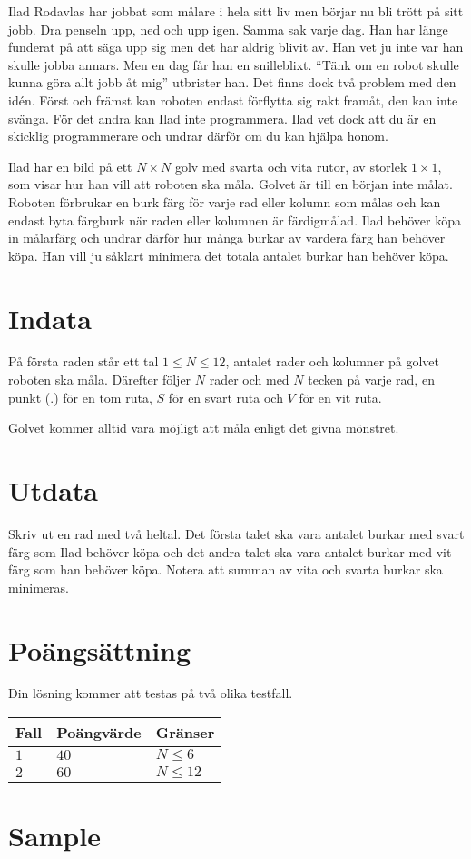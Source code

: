 Ilad Rodavlas har jobbat som målare i hela sitt liv men börjar nu bli trött på sitt jobb. Dra penseln upp, ned och upp igen. Samma sak varje dag. Han har länge funderat på att säga upp sig men det har aldrig blivit av. Han vet ju inte var han skulle jobba annars. Men en dag får han en snilleblixt. “Tänk om en robot skulle kunna göra allt jobb åt mig” utbrister han. Det finns dock två problem med den  idén. Först och främst kan roboten endast förflytta sig rakt framåt, den kan inte svänga. För det andra kan Ilad inte programmera. Ilad vet dock att du är en skicklig programmerare och undrar därför om du kan hjälpa honom. 

Ilad har en bild på ett $N \times N$ golv med svarta och vita rutor, av storlek $1 \times 1$, som visar hur han vill att roboten ska måla. Golvet är till en början inte målat. Roboten förbrukar en burk färg för varje rad eller kolumn som målas och kan endast byta färgburk när raden eller kolumnen är färdigmålad. Ilad behöver köpa in målarfärg och undrar därför hur många burkar av vardera färg han behöver köpa. Han vill ju såklart minimera det totala antalet burkar han behöver köpa. 

\section*{Indata}

På första raden står ett tal $1 \leq N \leq 12$, antalet rader och kolumner på golvet roboten ska måla. Därefter följer $N$ rader och med $N$ tecken på varje rad, en punkt ($.$) för en tom ruta, $S$ för en svart ruta och $V$ för en vit ruta.

Golvet kommer alltid vara möjligt att måla enligt det givna mönstret. 

\section*{Utdata}

Skriv ut en rad med två heltal. Det första talet ska vara antalet burkar med svart färg som Ilad behöver köpa och det andra talet ska vara antalet burkar med vit färg som han behöver köpa. Notera att summan av vita och svarta burkar ska minimeras. 

\section*{Poängsättning}

Din lösning kommer att testas på två olika testfall.

\noindent
\begin{tabular}{| l | l | l |}
  \hline
  Fall & Poängvärde & Gränser \\ \hline
  $1$    & $40$    &  $N \leq 6$  \\ \hline 
  $2$    & $60$    &  $N \leq 12$  \\ \hline 
\end{tabular}

\section*{Sample}

